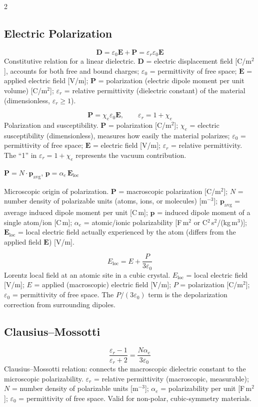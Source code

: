 \documentclass[9pt]{extarticle}
\newcommand{\desc}[1]{{\small\color{desc}#1}}
\begin{document}
\begin{multicols}{2}

\subsection{Electric Polarization}
\[\mathbf{D} = \varepsilon_0\mathbf{E} + \mathbf{P} = \varepsilon_r\varepsilon_0\mathbf{E}\]
\desc{Constitutive relation for a linear dielectric. $\mathbf{D}$ = electric displacement field [C/m$^2$], accounts for both free and bound charges; $\varepsilon_0$ = permittivity of free space; $\mathbf{E}$ = applied electric field [V/m]; $\mathbf{P}$ = polarization (electric dipole moment per unit volume) [C/m$^2$]; $\varepsilon_r$ = relative permittivity (dielectric constant) of the material (dimensionless, $\varepsilon_r \geq 1$).}

\[\mathbf{P} = \chi_e\varepsilon_0\mathbf{E},\qquad \varepsilon_r = 1 + \chi_e\]
\desc{Polarization and susceptibility. $\mathbf{P}$ = polarization [C/m$^2$]; $\chi_e$ = electric susceptibility (dimensionless), measures how easily the material polarizes; $\varepsilon_0$ = permittivity of free space; $\mathbf{E}$ = electric field [V/m]; $\varepsilon_r$ = relative permittivity. The ``1'' in $\varepsilon_r = 1 + \chi_e$ represents the vacuum contribution.}

$\mathbf{P} = N\cdot\mathbf{p}_{\text{avg}}$, \quad $\mathbf{p} = \alpha_e\,\mathbf{E}_{\text{loc}}$

\desc{Microscopic origin of polarization. $\mathbf{P}$ = macroscopic polarization [C/m$^2$]; $N$ = number density of polarizable units (atoms, ions, or molecules) [m$^{-3}$]; $\mathbf{p}_{\text{avg}}$ = average induced dipole moment per unit [C\,m]; $\mathbf{p}$ = induced dipole moment of a single atom/ion [C\,m]; $\alpha_e$ = atomic/ionic polarizability [F\,m$^2$ or C$^2$\,s$^2$/(kg\,m$^3$)]; $\mathbf{E}_{\text{loc}}$ = local electric field actually experienced by the atom (differs from the applied field $\mathbf{E}$) [V/m].}

\[E_{\text{loc}} = E + \frac{P}{3\varepsilon_0}\]
\desc{Lorentz local field at an atomic site in a cubic crystal. $E_{\text{loc}}$ = local electric field [V/m]; $E$ = applied (macroscopic) electric field [V/m]; $P$ = polarization [C/m$^2$]; $\varepsilon_0$ = permittivity of free space. The $P/(3\varepsilon_0)$ term is the depolarization correction from surrounding dipoles.}

\subsection{Clausius--Mossotti}
\[\frac{\varepsilon_r - 1}{\varepsilon_r + 2} = \frac{N\alpha_e}{3\varepsilon_0}\]
\desc{Clausius--Mossotti relation: connects the macroscopic dielectric constant to the microscopic polarizability. $\varepsilon_r$ = relative permittivity (macroscopic, measurable); $N$ = number density of polarizable units [m$^{-3}$]; $\alpha_e$ = polarizability per unit [F\,m$^2$]; $\varepsilon_0$ = permittivity of free space. Valid for non-polar, cubic-symmetry materials.}


\end{multicols}
\end{document}
